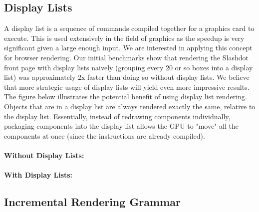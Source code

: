 \documentclass[11pt]{article}
\begin{document}
\subsection{Display Lists}
A display list is a sequence of commands compiled together for a graphics card to execute. This is used extensively in the field of graphics as the speedup is very significant given a large enough input. We are interested in applying this concept for browser rendering. Our initial benchmarks show that rendering the Slashdot front page with display lists naively (grouping every 20 or so boxes into a display list) was approximately 2x faster than doing so without display lists. We believe that more strategic usage of display lists will yield even more impressive results. The figure below illustrates the potential benefit of using display list rendering. Objects that are in a display list are always rendered exactly the same, relative to the display list. Essentially, instead of redrawing components individually, packaging components into the display list allows the GPU to "move" all the components at once (since the instructions are already compiled). 

\paragraph {Without Display Lists:}
\begin{center} \setlength\fboxsep{0pt}
\setlength\fboxrule{0.5pt}
\end{center}

\paragraph {With Display Lists:}
\begin{center} \setlength\fboxsep{0pt}
\setlength\fboxrule{0.5pt}
\end{center}

\subsection{Incremental Rendering Grammar}
\end{document}
